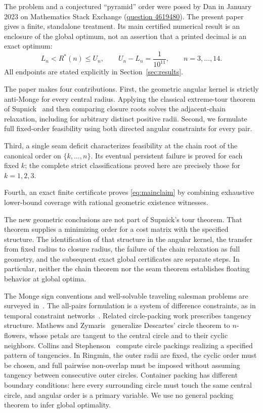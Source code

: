 \documentclass[11pt]{article}
\theoremstyle{definition}
\theoremstyle{remark}
\newcommand{\Rstar}{R^*}
\begin{document}
The problem and a conjectured ``pyramid'' order were posed by Dan in
January 2023 on Mathematics Stack Exchange
(\href{https://math.stackexchange.com/q/4619480}{question 4619480}).
The present paper gives a finite, standalone treatment. Its main certified
numerical result is an enclosure of the global optimum, not an assertion
that a printed decimal is an exact optimum:
\begin{equation}\label{eq:mainclaim}
 L_n<\Rstar(n)\le U_n,\qquad U_n-L_n=\frac1{10^{11}},
 \qquad n=3,\ldots,14.
\end{equation}
All endpoints are stated explicitly in Section~\ref{sec:results}.

The paper makes four contributions. First, the geometric angular kernel is
strictly anti-Monge for every central radius. Applying the
classical extreme-tour theorem of Supnick~\cite{supnick} and then comparing
closure roots solves the adjacent-chain relaxation, including for arbitrary
distinct positive radii. Second, we formulate full fixed-order feasibility
using both directed angular constraints for every pair.

Third, a single seam deficit characterizes feasibility at the chain root
of the canonical order on $\{k,\ldots,n\}$. Its eventual persistent failure is proved for
each fixed $k$; the complete strict classifications proved here are precisely
those for $k=1,2,3$.

Fourth, an exact finite certificate proves \eqref{eq:mainclaim} by combining
exhaustive lower-bound coverage with
rational geometric existence witnesses.

The new geometric conclusions are not part of Supnick's tour theorem.
That theorem supplies a minimizing order for a cost matrix with the specified
structure. The identification of that structure in the angular kernel,
the transfer from fixed radius to closure radius, the failure of the chain
relaxation as full geometry, and the subsequent exact global certificates
are separate steps. In particular, neither the chain theorem nor the seam
theorem establishes floating behavior at global optima.

The Monge sign conventions and well-solvable traveling salesman problems
are surveyed in~\cite{survey}. The all-pairs formulation is a system of
difference constraints, as in temporal constraint networks~\cite{stn}.
Related circle-packing work prescribes tangency structure. Mathews and
Zymaris~\cite{mathews-zymaris} generalize Descartes' circle theorem to
$n$-flowers, whose petals are tangent to the central circle and to their
cyclic neighbors. Collins and Stephenson~\cite{collins-stephenson} compute
circle packings realizing a specified pattern of tangencies. In Ringmin,
the outer radii are fixed, the cyclic order must be chosen, and full
pairwise non-overlap must be imposed without assuming tangency between
consecutive outer circles.
Container packing has different boundary conditions: here every surrounding
circle must touch the same central circle, and angular order is a primary
variable. We use no general packing theorem to infer global optimality.
\end{document}
